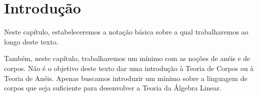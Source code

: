 \chapter{Introdução}
Neste capítulo, estabeleceremos a notação básica sobre a qual trabalharemos ao longo deste texto.

Também, neste capítulo, trabalharemos um mínimo com as noções de anéis e de corpos.
Não é o objetivo deste texto dar uma introdução à Teoria de Corpos ou à Teoria de Anéis.
Apenas buscamos introduzir um mínimo sobre a linguagem de corpos que seja suficiente para desenvolver a Teoria da Álgebra Linear.




